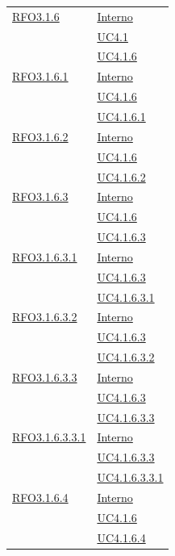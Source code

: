 \begin{itemize}
\begin{itemize}
\begin{itemize}
\begin{itemize}
\begin{longtable}{|>{\centering}m{5cm}|m{5cm}<{\centering}|}
\hyperlink{RFO3.1.6}{RFO3.1.6} & \hyperlink{Interno}{Interno}\\
& \hyperref[UC4.1]{UC4.1}\\
& \hyperref[UC4.1.6]{UC4.1.6}\\ \hline

\hyperlink{RFO3.1.6.1}{RFO3.1.6.1} & \hyperlink{Interno}{Interno}\\
& \hyperref[UC4.1.6]{UC4.1.6}\\
& \hyperref[UC4.1.6.1]{UC4.1.6.1}\\ \hline

\hyperlink{RFO3.1.6.2}{RFO3.1.6.2} & \hyperlink{Interno}{Interno}\\
& \hyperref[UC4.1.6]{UC4.1.6}\\
& \hyperref[UC4.1.6.2]{UC4.1.6.2}\\ \hline

\hyperlink{RFO3.1.6.3}{RFO3.1.6.3} & \hyperlink{Interno}{Interno}\\
& \hyperref[UC4.1.6]{UC4.1.6}\\
& \hyperref[UC4.1.6.3]{UC4.1.6.3}\\ \hline

\hyperlink{RFO3.1.6.3.1}{RFO3.1.6.3.1} & \hyperlink{Interno}{Interno}\\
& \hyperref[UC4.1.6.3]{UC4.1.6.3}\\
& \hyperref[UC4.1.6.3.1]{UC4.1.6.3.1}\\ \hline

\hyperlink{RFO3.1.6.3.2}{RFO3.1.6.3.2} & \hyperlink{Interno}{Interno}\\
& \hyperref[UC4.1.6.3]{UC4.1.6.3}\\
& \hyperref[UC4.1.6.3.2]{UC4.1.6.3.2}\\ \hline

\hyperlink{RFO3.1.6.3.3}{RFO3.1.6.3.3} & \hyperlink{Interno}{Interno}\\
& \hyperref[UC4.1.6.3]{UC4.1.6.3}\\
& \hyperref[UC4.1.6.3.3]{UC4.1.6.3.3}\\ \hline

\hyperlink{RFO3.1.6.3.3.1}{RFO3.1.6.3.3.1} & \hyperlink{Interno}{Interno}\\
& \hyperref[UC4.1.6.3.3]{UC4.1.6.3.3}\\
& \hyperref[UC4.1.6.3.3.1]{UC4.1.6.3.3.1}\\ \hline

\hyperlink{RFO3.1.6.4}{RFO3.1.6.4} & \hyperlink{Interno}{Interno}\\
& \hyperref[UC4.1.6]{UC4.1.6}\\
& \hyperref[UC4.1.6.4]{UC4.1.6.4}\\ \hline


\end{longtable}
\end{itemize}
\end{itemize}
\end{itemize}
\end{itemize}
